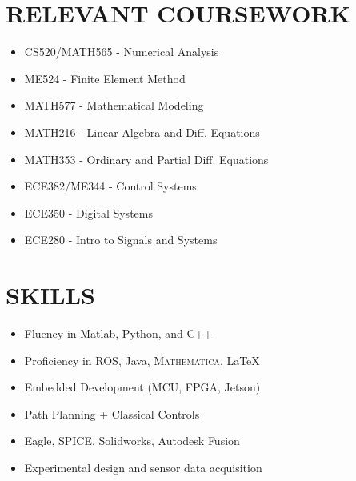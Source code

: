 \documentclass[paper=letter,fontsize=11pt]{scrartcl} %
\newcommand{\NewPart}[2]{\section*{\uppercase{#1} #2}}
\begin{document}

\NewPart{Relevant Coursework}{}
	\begin{itemize}
		\item CS520/MATH565 - Numerical Analysis
		\item ME524 - Finite Element Method
		\item MATH577 - Mathematical Modeling
		\item MATH216 - Linear Algebra and Diff. Equations
		\item MATH353 - Ordinary and Partial Diff. Equations
		\item ECE382/ME344 - Control Systems
		\item ECE350 - Digital Systems
		\item ECE280 - Intro to Signals and Systems
	\end{itemize}

\NewPart{Skills}{}

\begin{itemize} %
	\item Fluency in Matlab, Python, and C++
	\item Proficiency in ROS, Java, \textsc{Mathematica}, \LaTeX
	\item Embedded Development (MCU, FPGA, Jetson)
	\item Path Planning + Classical Controls
	\item Eagle, SPICE, Solidworks, Autodesk Fusion
	\item Experimental design and sensor data acquisition
\end{itemize}
\end{document}
